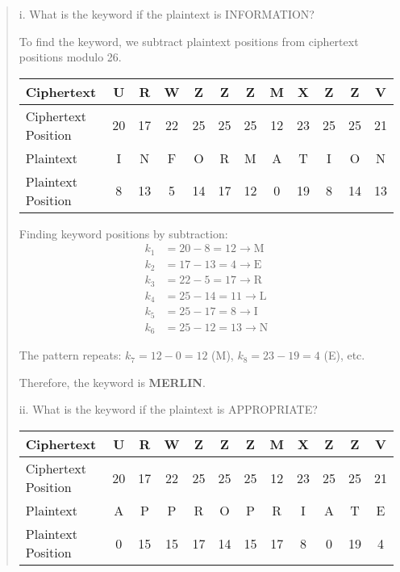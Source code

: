 \documentclass[12pt]{article}
\begin{document}
\begin{quote}
i. What is the keyword if the plaintext is INFORMATION?

\vspace{0.3cm}

To find the keyword, we subtract plaintext positions from ciphertext positions modulo 26.

\begin{center}
\begin{tabular}{|l|c|c|c|c|c|c|c|c|c|c|c|}
\hline
Ciphertext & U & R & W & Z & Z & Z & M & X & Z & Z & V \\
\hline
Ciphertext Position & 20 & 17 & 22 & 25 & 25 & 25 & 12 & 23 & 25 & 25 & 21 \\
\hline
Plaintext & I & N & F & O & R & M & A & T & I & O & N \\
\hline
Plaintext Position & 8 & 13 & 5 & 14 & 17 & 12 & 0 & 19 & 8 & 14 & 13 \\
\hline
\end{tabular}
\end{center}

\vspace{0.3cm}

Finding keyword positions by subtraction:
\begin{align*}
k_1 &= 20 - 8 = 12 \rightarrow \text{M}\\
k_2 &= 17 - 13 = 4 \rightarrow \text{E}\\
k_3 &= 22 - 5 = 17 \rightarrow \text{R}\\
k_4 &= 25 - 14 = 11 \rightarrow \text{L}\\
k_5 &= 25 - 17 = 8 \rightarrow \text{I}\\
k_6 &= 25 - 12 = 13 \rightarrow \text{N}
\end{align*}

The pattern repeats: $k_7 = 12 - 0 = 12$ (M), $k_8 = 23 - 19 = 4$ (E), etc.

Therefore, the keyword is \textbf{MERLIN}.

\vspace{0.5cm}

ii. What is the keyword if the plaintext is APPROPRIATE?

\vspace{0.3cm}

\begin{center}
\begin{tabular}{|l|c|c|c|c|c|c|c|c|c|c|c|}
\hline
Ciphertext & U & R & W & Z & Z & Z & M & X & Z & Z & V \\
\hline
Ciphertext Position & 20 & 17 & 22 & 25 & 25 & 25 & 12 & 23 & 25 & 25 & 21 \\
\hline
Plaintext & A & P & P & R & O & P & R & I & A & T & E \\
\hline
Plaintext Position & 0 & 15 & 15 & 17 & 14 & 15 & 17 & 8 & 0 & 19 & 4 \\
\hline
\end{tabular}
\end{center}


\end{quote}
\end{document}
